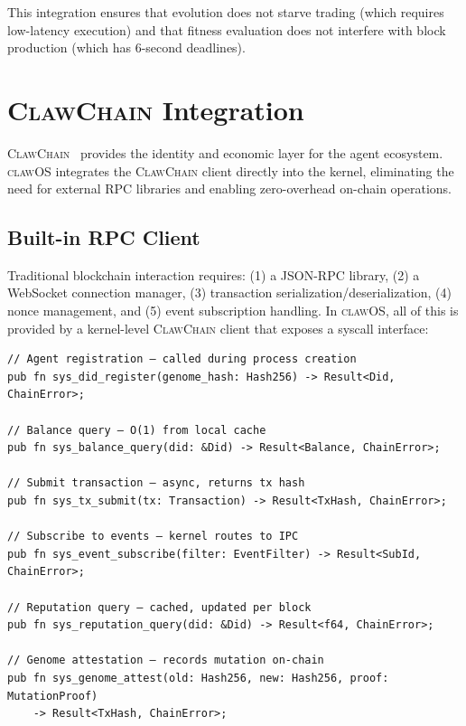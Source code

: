 \documentclass{article}
\newcommand{\clawos}{\textsc{clawOS}}
\newcommand{\clawchain}{\textsc{ClawChain}}
\begin{document}
This integration ensures that evolution does not starve trading (which requires low-latency execution) and that fitness evaluation does not interfere with block production (which has 6-second deadlines).

%
%

\section{\clawchain{} Integration}
\label{sec:clawchain_integration}

\clawchain{}~\cite{chen2026clawchain} provides the identity and economic layer for the agent ecosystem. \clawos{} integrates the \clawchain{} client directly into the kernel, eliminating the need for external RPC libraries and enabling zero-overhead on-chain operations.

\subsection{Built-in RPC Client}
\label{subsec:rpc}

Traditional blockchain interaction requires: (1) a JSON-RPC library, (2) a WebSocket connection manager, (3) transaction serialization/deserialization, (4) nonce management, and (5) event subscription handling. In \clawos{}, all of this is provided by a kernel-level \clawchain{} client that exposes a syscall interface:

\begin{lstlisting}[style=rustcode, caption={ClawChain syscall interface (kernel-level).}, label={lst:chainapi}]
// Agent registration — called during process creation
pub fn sys_did_register(genome_hash: Hash256) -> Result<Did, ChainError>;

// Balance query — O(1) from local cache
pub fn sys_balance_query(did: &Did) -> Result<Balance, ChainError>;

// Submit transaction — async, returns tx hash
pub fn sys_tx_submit(tx: Transaction) -> Result<TxHash, ChainError>;

// Subscribe to events — kernel routes to IPC
pub fn sys_event_subscribe(filter: EventFilter) -> Result<SubId, ChainError>;

// Reputation query — cached, updated per block
pub fn sys_reputation_query(did: &Did) -> Result<f64, ChainError>;

// Genome attestation — records mutation on-chain
pub fn sys_genome_attest(old: Hash256, new: Hash256, proof: MutationProof)
    -> Result<TxHash, ChainError>;
\end{lstlisting}
\end{document}

